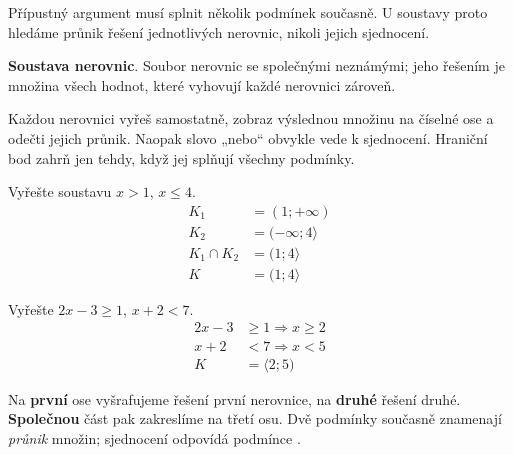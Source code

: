 \documentclass[11pt,a4paper]{article}
\begin{document}
Přípustný argument musí splnit několik podmínek současně. U soustavy proto hledáme průnik řešení jednotlivých nerovnic, nikoli jejich sjednocení.
\begin{definiceBox}[title={Definice - Soustava nerovnic}]
\textbf{Soustava nerovnic}. Soubor nerovnic se společnými neznámými; jeho řešením je množina všech hodnot, které vyhovují každé nerovnici zároveň.
\end{definiceBox}
Každou nerovnici vyřeš samostatně, zobraz výslednou množinu na číselné ose a odečti jejich průnik. Naopak slovo „nebo“ obvykle vede k sjednocení. Hraniční bod zahrň jen tehdy, když jej splňují všechny podmínky.
\begin{prikladReseniBox}[title={Příklad 1}]
Vyřešte soustavu $x>1$, $x\le4$.
\tcblower
\[
\begin{aligned}
K_1&=(1;+\infty) \\
 K_2&=(-\infty;4\rangle \\
 K_1\cap K_2&=(1;4\rangle \\[2mm]
K &= (1;4\rangle
\end{aligned}
\]
\end{prikladReseniBox}
\begin{prikladReseniBox}[title={Příklad 2}]
Vyřešte $2x-3\ge1$, $x+2<7$.
\tcblower
\[
\begin{aligned}
2x-3&\ge1\Rightarrow x\ge2 \\
 x+2&<7\Rightarrow x<5 \\[2mm]
K &= \langle2;5)
\end{aligned}
\]
\end{prikladReseniBox}
Na \textbf{první} ose vyšrafujeme řešení první nerovnice, na \textbf{druhé} řešení druhé. \textbf{Společnou} část pak zakreslíme na třetí osu. Dvě podmínky současně znamenají \emph{průnik} množin; sjednocení odpovídá podmínce .
\begin{center}
\end{center}
\end{document}
